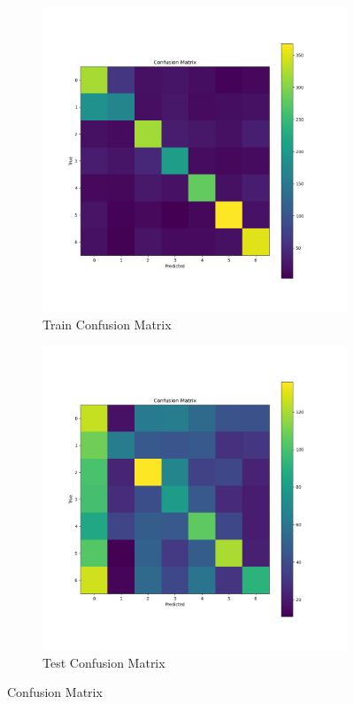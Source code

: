 \documentclass{article}
\begin{document}
    
\begin{figure}[h!]
    \centering
    \begin{subfigure}{0.45\textwidth}
        \includegraphics[width=\textwidth]{./pic/confusion_matrix_3041.png}
        \caption{Train Confusion Matrix}
        \label{fig:confusion_matrix_train_aug}
    \end{subfigure}
    \hfill %
    \begin{subfigure}{0.45\textwidth}
        \includegraphics[width=\textwidth]{./pic/confusion_matrix_2723_1.png}
        \caption{Test Confusion Matrix}
        \label{fig:confusion_matrix_test_aug}
    \end{subfigure}
    \caption{Confusion Matrix}
\end{figure}
\end{document}
